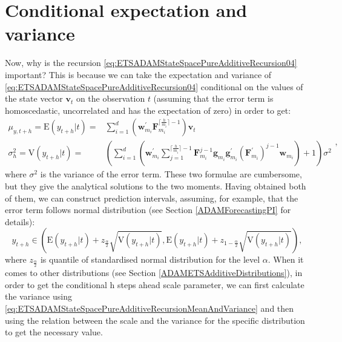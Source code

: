 \documentclass[]{book}
\theoremstyle{definition}
\theoremstyle{definition}
\theoremstyle{definition}
\theoremstyle{definition}
\theoremstyle{remark}
\begin{document}
\hypertarget{pureAdditiveExpectationAndVariance}{%
\section{Conditional expectation and variance}\label{pureAdditiveExpectationAndVariance}}

Now, why is the recursion \eqref{eq:ETSADAMStateSpacePureAdditiveRecursion04} important? This is because we can take the expectation and variance of \eqref{eq:ETSADAMStateSpacePureAdditiveRecursion04} conditional on the values of the state vector \(\mathbf{v}_{t}\) on the observation \(t\) (assuming that the error term is homoscedastic, uncorrelated and has the expectation of zero) in order to get:
\begin{equation}
  \begin{aligned}
    \mu_{y,t+h} = \text{E}(y_{t+h}|t) = & \sum_{i=1}^d \left(\mathbf{w}_{m_i}^\prime \mathbf{F}_{m_i}^{\lceil\frac{h}{m_i}\rceil-1} \right) \mathbf{v}_{t} \\
    \sigma^2_{h} = \text{V}(y_{t+h}|t) = & \left( \sum_{i=1}^d \left(\mathbf{w}_{m_i}^\prime \sum_{j=1}^{\lceil\frac{h}{m_i}\rceil-1} \mathbf{F}_{m_i}^{j-1} \mathbf{g}_{m_i} \mathbf{g}^\prime_{m_i} (\mathbf{F}_{m_i}^\prime)^{j-1} \mathbf{w}_{m_i} \right) + 1 \right) \sigma^2
  \end{aligned},
  \label{eq:ETSADAMStateSpacePureAdditiveRecursionMeanAndVariance}
\end{equation}
where \(\sigma^2\) is the variance of the error term. These two formulae are cumbersome, but they give the analytical solutions to the two moments. Having obtained both of them, we can construct prediction intervals, assuming, for example, that the error term follows normal distribution (see Section \ref{ADAMForecastingPI} for details):
\begin{equation}
    y_{t+h} \in \left( \text{E}(y_{t+h}|t) + z_{\frac{\alpha}{2}} \sqrt{\text{V}(y_{t+h}|t)}, \text{E}(y_{t+h}|t) + z_{1-\frac{\alpha}{2}} \sqrt{\text{V}(y_{t+h}|t)} \right),
  \label{eq:ETSADAMStateSpacePureAdditivePredictionInterval}
\end{equation}
where \(z_{\frac{\alpha}{2}}\) is quantile of standardised normal distribution for the level \(\alpha\). When it comes to other distributions (see Section \ref{ADAMETSAdditiveDistributions}), in order to get the conditional h steps ahead scale parameter, we can first calculate the variance using \eqref{eq:ETSADAMStateSpacePureAdditiveRecursionMeanAndVariance} and then using the relation between the scale and the variance for the specific distribution \citep[see discussion in Chapter 3 of][]{SvetunkovSBA} to get the necessary value.
\end{document}
